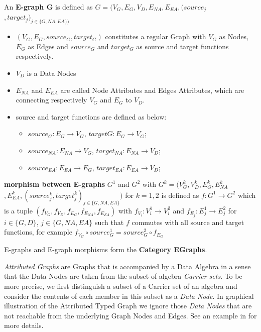 \begin{ProposalDef}
An \textbf{E-graph G} is defined as $G=(V_G,E_G, V_D, E_{NA},E_{EA} ,(source_j$ $,target_j)_{j \in \{G,NA,EA\}) }$
\begin{itemize}
	\item $(V_G,E_G,source_G,target_G)$ constitutes a regular Graph with $V_G$ as Nodes, $E_G$ as Edges and $source_G$ and $target_G$ as source and target functions  respectively.
	\item $V_D$ is a Data Nodes
	\item $E_{NA}$ and $E_{EA}$ are called Node Attributes and Edges Attributes, which are connecting respectively $V_G$  and $E_G$ to $V_D$. 
	\item source and target functions are defined as below:
	\begin{itemize}
		\item $source_G : E_G \rightarrow V_G$, $targetG : E_G \rightarrow V_G$;
		\item $source_{NA} : E_{NA} \rightarrow V_G$, $target_{NA}: E_{NA} \rightarrow V_D$;
		\item $source_{EA} : E_{EA} \rightarrow E_G$, $target_{EA}: E_{EA} \rightarrow V_D$;
	\end{itemize}
\end{itemize}

\end{ProposalDef}

\begin{ProposalDef}

\textbf{morphism between E-graphs} $G^1$ and $G^2$ with 
$G^k = (V_G^k, V_D^k, E_G^k, E_{NA}^k$ $,E_{EA}^k, (source_j^k, target_j^k)_{j \in \{ G, NA, EA \}})$ for $k = 1, 2$ is defined as $f:G^1 \rightarrow G^2$ which is a tuple $(f_{V_G},f_{V_D},f_{E_G},f_{E_{NA}},f_{E_{EA}})$ 
with $f_{V_i} : V_i^1 \rightarrow V_i^2$ and  $f_{E_j} : E_j^1 \rightarrow E_j^2$ for $i \in \{G,D\}$, $j \in \{G,NA,EA\}$ such that $f$ commutes with all source and target functions, for example $f_{V_G}  \circ source_G^1= source_G^2 \circ f_{E_G}$

\end{ProposalDef}

\begin{ProposalDef}
E-graphs and E-graph morphisms form the \textbf{Category EGraphs}.
\end{ProposalDef}

 {\em Attributed Graphs} are Graphs that is accompanied by a Data Algebra in a sense that the Data Nodes are taken from the subset of algebra {\em Carrier sets}. To be more precise, we first distinguish a subset of a Carrier set of an algebra and consider the contents of each member in this subset as a {\em Data Node}. In graphical illustration of the Attributed Typed Graph we ignore those {\em Data Nodes} that are not reachable from the underlying Graph Nodes and Edges. See an example in \cite{book:Ehrig2010} for more details.
  
